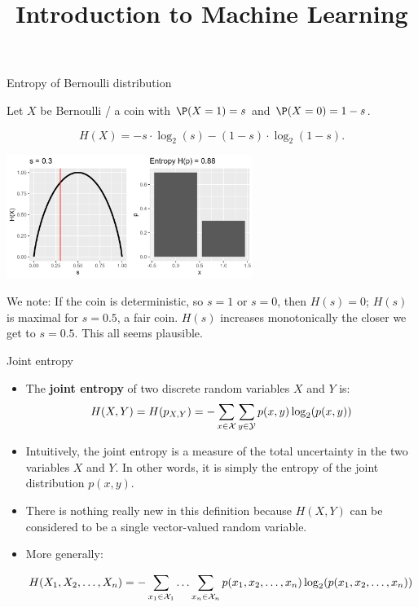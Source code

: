 \documentclass[11pt,compress,t,notes=noshow, xcolor=table]{beamer}
\title{Introduction to Machine Learning}
\begin{document}
    

\begin{vbframe}{Entropy of Bernoulli distribution}

Let $X$ be Bernoulli / a coin with $\P(X=1) = s$ and $\P(X=0) = 1 - s$.

$$ H(X)= -s \cdot \log_2(s)-(1-s)\cdot \log_2(1-s). $$

\begin{center}
\includegraphics[width = 8.0cm ]{figure/entropy_bernoulli.png} \\
\end{center}

We note: If the coin is deterministic, so $s=1$ or $s=0$, then $H(s)=0$; 
$H(s)$ is maximal for $s = 0.5$, a fair coin. 
$H(s)$ increases monotonically the closer we get to $s=0.5$.
This all seems plausible.

\end{vbframe}

\begin{vbframe} {Joint entropy}
\begin{itemize}
  \item The \textbf{joint entropy} of two discrete random variables $X$ and $Y$ is:
    $$ H(X,Y) = H(p_{X,Y}) = - \sum_{x \in \mathcal{X}} \sum_{y \in \mathcal{Y}}  p(x,y) \log_2(p(x,y))$$
  \item Intuitively, the joint entropy is a measure of the total uncertainty in the two variables $X$ and $Y$. In other words, it is simply the entropy of the joint distribution $p(x,y)$.
  \item There is nothing really new in this definition because $H(X, Y)$ can be considered to be a single vector-valued random variable.
  \item More generally:
    \begin{footnotesize}  
  $$ H(X_1, X_2, \ldots, X_n) = - \sum_{x_1 \in \mathcal{X}_1} \ldots \sum_{x_n \in \mathcal{X}_n} p(x_1,x_2, \ldots, x_n) \log_2(p(x_1,x_2, \ldots, x_n)) $$ 
    \end{footnotesize}  
\end{itemize}
\end{vbframe}
\end{document}
